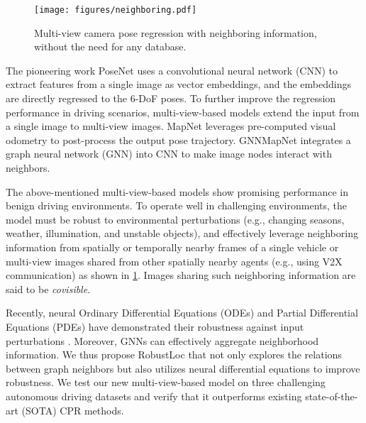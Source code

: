 \documentclass[letterpaper]{article} \usepackage{aaai23}  \usepackage{times}  \usepackage{helvet}  \usepackage{courier}  \usepackage[hyphens]{url}  \usepackage{graphicx} \urlstyle{rm} \def\UrlFont{\rm}  \usepackage{natbib}  \usepackage{caption} \frenchspacing  \setlength{\pdfpagewidth}{8.5in} \setlength{\pdfpageheight}{11in} \usepackage{booktabs}
\theoremstyle{remark}
\theoremstyle{plain}
\begin{document}
\begin{figure}[!t]
\begin{center}
\texttt{[image: figures/neighboring.pdf]}
\end{center}
\caption{Multi-view camera pose regression with neighboring information, without the need for any database. }
\label{fig:neighboring}
\end{figure}

The pioneering work PoseNet \cite{posenet} uses a convolutional neural network (CNN) to extract features from a single image as vector embeddings, and the embeddings are directly regressed to the 6-DoF poses. To further improve the regression performance in driving scenarios, multi-view-based models extend the input from a single image to multi-view images. MapNet \cite{mapnet} leverages pre-computed visual odometry to post-process the output pose trajectory. GNNMapNet \cite{gnnmapnet} integrates a graph neural network (GNN) into CNN to make image nodes interact with neighbors.

The above-mentioned multi-view-based models show promising performance in benign driving environments. To operate well in challenging environments, the model must be robust to environmental perturbations (e.g., changing seasons, weather, illumination, and unstable objects), and effectively leverage neighboring information from spatially or temporally nearby frames of a single vehicle or multi-view images shared from other spatially nearby agents (e.g., using V2X communication) as shown in \cref{fig:neighboring}. Images sharing such neighboring information are said to be \emph{covisible}.

Recently, neural Ordinary Differential Equations (ODEs)  \cite{chen2018neural}  and Partial Differential Equations (PDEs) \cite{chamberlain2021grand, chamberlain2021blend}  have demonstrated their robustness against input perturbations  \cite{yan2019robustness,kang2021Neurips}. Moreover, GNNs can effectively aggregate neighborhood information. We thus propose RobustLoc that not only explores the relations between graph neighbors but also utilizes neural differential equations to improve robustness. We test our new multi-view-based model on three challenging autonomous driving datasets and verify that it outperforms existing state-of-the-art (SOTA) CPR methods.
\end{document}
